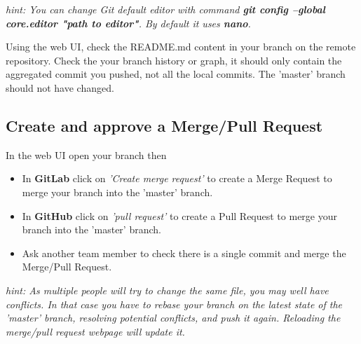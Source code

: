\textit{hint: You can change Git default editor with command \textbf{git config --global core.editor "path to editor"}.
By default it uses \textbf{nano}.}

Using the web UI, check the README.md content in your branch on the remote repository.
Check the your branch history or graph, it should only contain the aggregated commit you pushed, not all the local commits.
The 'master' branch should not have changed.

\subsection{Create and approve a Merge/Pull Request}  %

In the web UI open your branch then
\begin{itemize}
    \item In \textbf{GitLab} click on \textit{'Create merge request'} to create a Merge Request to merge your branch into the 'master' branch.
    \item In \textbf{GitHub} click on \textit{'pull request'} to create a Pull Request to merge your branch into the 'master' branch.
    \item Ask another team member to check there is a single commit and merge the Merge/Pull Request.
\end{itemize}

\textit{hint: As multiple people will try to change the same file, you may well have conflicts.
In that case you have to rebase your branch on the latest state of the 'master' branch, resolving potential conflicts, and push it again.
Reloading the merge/pull request webpage will update it.}



